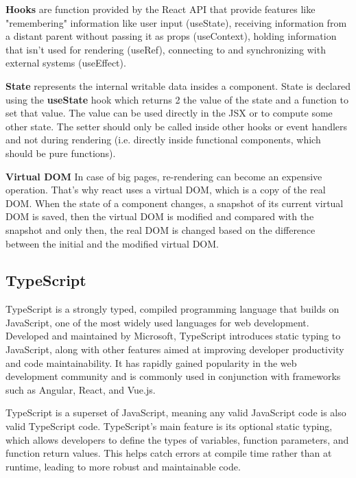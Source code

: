 \par \textbf{Hooks} are function provided by the React API that provide features like "remembering" information like user input (useState), receiving information from a distant parent without passing it as props (useContext), holding information that isn't used for rendering (useRef), connecting to and synchronizing with external systems (useEffect). \cite{reactHooks}

\par \textbf{State} represents the internal writable data insides a component. State is declared using the \textbf{useState} hook which returns 2 the value of the state and a function to set that value. The value can be used directly in the JSX or to compute some other state. The setter should only be called inside other hooks or event handlers and not during rendering (i.e. directly inside functional components, which should be pure functions).

\par \textbf{Virtual DOM} In case of big pages, re-rendering can become an expensive operation. That's why react uses a virtual DOM, which is a copy of the real DOM. When the state of a component changes, a snapshot of its current virtual DOM is saved, then the virtual DOM is modified and compared with the snapshot and only then, the real DOM is changed based on the difference between the initial and the modified virtual DOM.

\subsection{TypeScript}

\par TypeScript is a strongly typed, compiled programming language that builds on JavaScript, one of the most widely used languages for web development. Developed and maintained by Microsoft, TypeScript introduces static typing to JavaScript, along with other features aimed at improving developer productivity and code maintainability. It has rapidly gained popularity in the web development community and is commonly used in conjunction with frameworks such as Angular, React, and Vue.js.

\par TypeScript is a superset of JavaScript, meaning any valid JavaScript code is also valid TypeScript code. TypeScript’s main feature is its optional static typing, which allows developers to define the types of variables, function parameters, and function return values. This helps catch errors at compile time rather than at runtime, leading to more robust and maintainable code.

